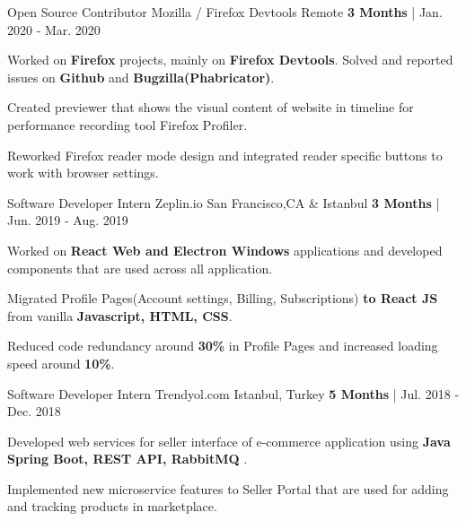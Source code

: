 \begin{cventries}
  \cventry
   {Open Source Contributor} %
    {Mozilla / Firefox Devtools} %
    {Remote} %
    {\textbf{3 Months} | Jan. 2020 - Mar. 2020} %
    {
      \begin{cvitems} %
        \item {Worked on \textbf{Firefox} projects, mainly on \textbf{Firefox Devtools}. Solved and reported issues on \textbf{Github} and \textbf{Bugzilla(Phabricator)}.}
        \item {Created previewer that shows the visual content of website in timeline for performance recording tool Firefox Profiler.
        \item {Reworked Firefox reader mode design and integrated reader specific buttons to work with browser settings.}
}
      \end{cvitems}
    }
  \cventry
   {Software Developer Intern} %
    {Zeplin.io} %
    {San Francisco,CA \& Istanbul} %
    {\textbf{3 Months} | Jun. 2019 - Aug. 2019} %
    {
      \begin{cvitems} %
        \item {Worked on \textbf{React Web and Electron Windows} applications and developed components that are used across all application.}
		\item {Migrated Profile Pages(Account settings, Billing, Subscriptions) \textbf{to React JS} from vanilla \textbf{Javascript, HTML, CSS}.}
        \item {Reduced code redundancy around \textbf{30\%} in Profile Pages and increased loading speed around \textbf{10\%}. }
      \end{cvitems}
    }
  \cventry
   {Software Developer Intern} %
    {Trendyol.com} %
    {Istanbul, Turkey} %
    {\textbf{5 Months} | Jul. 2018 - Dec. 2018} %
    {
      \begin{cvitems} %
		 \item {Developed web services for seller interface of e-commerce application using \textbf{Java Spring Boot, REST API, RabbitMQ} .}
        \item {Implemented new microservice features to Seller Portal that are used for adding and tracking products in marketplace.}

\end{cvitems}}
\end{cventries}
